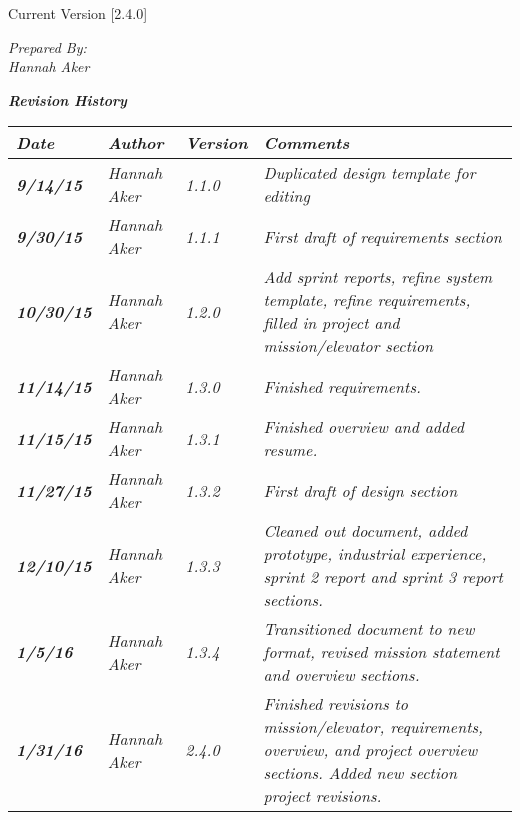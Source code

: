 


Current Version [2.4.0]
\vspace*{5mm}

{\color{SDColor5}
\noindent
\textit{Prepared By:}\\
\textit{Hannah Aker}
}

\vfill
\noindent
{ \textit{\textbf{Revision History}}}\\
\begin{tabular}{|>{\raggedright}p{1.5cm}|>{\raggedright}p{3cm}|>{\raggedright}p{1.5cm}|>{\raggedright}p{9cm}|}
\hline
\textit{\textbf{Date}} &  \textit{\textbf{Author}} & \textit{\textbf{Version}} & \textit{\textbf{Comments}}\tabularnewline
\hline
 \textit{\textbf{9/14/15}} & \textit{Hannah Aker} & \textit{1.1.0} & \textit{Duplicated design template for editing}\tabularnewline
\hline
 \textit{\textbf{9/30/15}} & \textit{Hannah Aker} & \textit{1.1.1} & \textit{First draft of requirements section}\tabularnewline
 \hline
  \textit{\textbf{10/30/15}} & \textit{Hannah Aker} & \textit{1.2.0} & \textit{Add sprint reports, refine system template, refine requirements, filled in project and mission/elevator section}\tabularnewline
\hline
 \textit{\textbf{11/14/15}} & \textit{Hannah Aker} & \textit{1.3.0} & \textit{Finished requirements.}\tabularnewline
\hline
 \textit{\textbf{11/15/15}} & \textit{Hannah Aker} & \textit{1.3.1} & \textit{Finished overview and added resume.}\tabularnewline
\hline
 \textit{\textbf{11/27/15}} & \textit{Hannah Aker} & \textit{1.3.2} & \textit{First draft of design section}\tabularnewline
\hline
 \textit{\textbf{12/10/15}} & \textit{Hannah Aker} & \textit{1.3.3} & \textit{Cleaned out document, added prototype, industrial experience, sprint 2 report and sprint 3 report sections.}\tabularnewline
\hline
 \textit{\textbf{1/5/16}} & \textit{Hannah Aker} & \textit{1.3.4} & \textit{Transitioned document to new format, revised mission statement and overview sections.}\tabularnewline
\hline
 \textit{\textbf{1/31/16}} & \textit{Hannah Aker} & \textit{2.4.0} & \textit{Finished revisions to mission/elevator, requirements, overview, and project overview sections. Added new section project revisions.}\tabularnewline
\hline
\end{tabular}
\vfill


